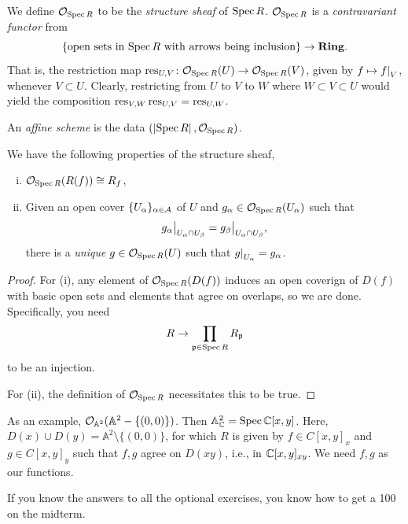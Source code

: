 We define $\mathcal O_{\operatorname{Spec} R}$ to be the \textit{structure sheaf} of $\operatorname{Spec} R$. $\mathcal O_{\operatorname{Spec} R}$ is a \textit{contravariant functor} from
\[ \{\text{open sets in $\operatorname{Spec} R$ with arrows being inclusion}\} \to \mathbf{Ring}. \]
That is, the restriction map $\operatorname{res}_{U,V} \colon \mathcal O_{\operatorname{Spec} R}(U) \to \mathcal O_{\operatorname{Spec} R}(V)$, given by $f \mapsto \restr{f}{V}$, whenever $V \subset U$. Clearly, restricting from $U$ to $V$ to $W$ where $W \subset V \subset U$ would yield the composition $\operatorname{res}_{V,W} \operatorname{res}_{U,V} = \operatorname{res}_{U,W}$. 

An \textit{affine scheme} is the data $(\left\lvert \operatorname{Spec} R \right\rvert, \mathcal O_{\operatorname{Spec} R})$.

\newpage
\begin{theorem} \label{thm:structure_sheaf_gluing_property}
    We have the following properties of the structure sheaf,
    \begin{enumerate}[(i)]
        \item $\mathcal O_{\operatorname{Spec} R}(R(f)) \cong R_f$,
        \item Given an open cover $\{U_\alpha\}_{\alpha \in \mathcal A}$ of $U$ and $g_\alpha \in \mathcal O_{\operatorname{Spec} R}(U_\alpha)$ such that
        \[ \restr{g_\alpha}{U_\alpha \cap U_\beta} = \restr{g_\beta}{U_\alpha \cap U_\beta}, \]
        there is a \textit{unique} $g \in \mathcal O_{\operatorname{Spec} R}(U)$ such that $\restr{g}{U_\alpha} = g_\alpha$.
    \end{enumerate}
\end{theorem}
\begin{proof}
    For (i), any element of $\mathcal O_{\operatorname{Spec} R}(D(f))$ induces an open coverign of $D(f)$ with basic open sets and elements that agree on overlaps, so we are done. Specifically, you need
    \[ R \to \prod_{\mathfrak p \in \operatorname{Spec} R} R_\mathfrak p \]
    to be an injection.

    For (ii), the definition of $\mathcal O_{\operatorname{Spec} R}$ necessitates this to be true.
\end{proof}

As an example, $\mathcal O_{\mathbb A^2}(\mathbb A^2 - \{(0, 0)\})$. Then $\mathbb A_\mathbb C^2 = \operatorname{Spec} \mathbb C[x, y]$. Here, $D(x) \cup D(y) = \mathbb A^2 \setminus \{(0, 0)\}$, for which $R$ is given by $f \in C[x, y]_x$ and $g \in C[x, y]_y$ such that $f, g$ agree on $D(xy)$, i.e., in $\mathbb C[x, y]_{xy}$. We need $f, g$ as our functions.

{\color{amethyst} If you know the answers to all the optional exercises, you know how to get a 100 on the midterm.}
